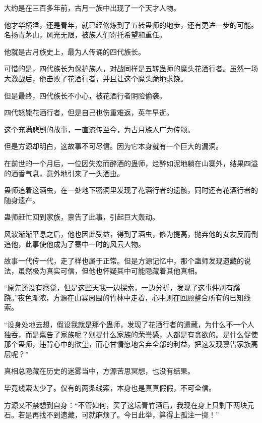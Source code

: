 
\begin{this_body}

大约是在三百多年前，古月一族中出现了一个天才人物。

他才华横溢，还是青年，就已经修炼到了五转蛊师的地步，还有更进一步的可能。名扬青茅山，风光无限，被族人们寄托希望和重任。

他就是古月族史上，最为人传诵的四代族长。

可惜的是，四代族长为保护族人，对战同样是五转蛊师的魔头花酒行者。虽然一场大激战后，他击败了花酒行者，并且让这个魔头跪地求饶。

但是最终，四代族长不小心，被花酒行者阴险偷袭。

四代怒毙花酒行者，但是自己也伤重难返，英年早逝。

这个充满悲剧的故事，一直流传至今，为古月族人广为传颂。

但是方源却明白，这故事不可尽信。因为它本身就有一个巨大的漏洞。

在前世的一个月后，一位因失恋而醉酒的蛊师，烂醉如泥地躺在山寨外，结果四溢的酒香气息，意外地引来了一头酒虫。

蛊师追着这酒虫，在一处地下密洞里发现了花酒行者的遗骸，同时还有花酒行者的随身遗产。

蛊师赶忙回到家族，禀告了此事，引起巨大轰动。

风波渐渐平息之后，他也因此受益，得到了酒虫，修为提高，抛弃他的女友反而倒追他，此事使他成为了寨中一时的风云人物。

故事一代传一代，走了样也属于正常。但是方源记忆中，那个蛊师发现遗藏的说法，虽然极为真实可信，但他也怀疑其中可能隐藏着其他真相。

“原先还没有察觉，但是这些天我一边探索，一边分析，发现了这事件别有蹊跷。”夜色渐浓，方源在山寨周围的竹林中走着，心中则在回顾整合所有的已知线索。

“设身处地去想，假设我就是那个蛊师，发现了花酒行者的遗藏，为什么不一个人独吞，而是禀告了家族呢？别提什么家族的荣誉感，人都是有贪欲的。是什么促使那个蛊师，违背心中的欲望，而心甘情愿地舍弃全部的利益，把这发现禀告家族高层呢？”

真相总隐藏在历史的迷雾当中，方源苦思冥想，也没有结果。

毕竟线索太少了。仅有的两条线索，本身也是真真假假，不可全信。

方源又不禁想到自身：“不管如何，买了这坛青竹酒后，我现在身上只剩下两块元石。若是再找不到遗藏，可就麻烦了。今日此举，算得上孤注一掷！”


\end{this_body}
